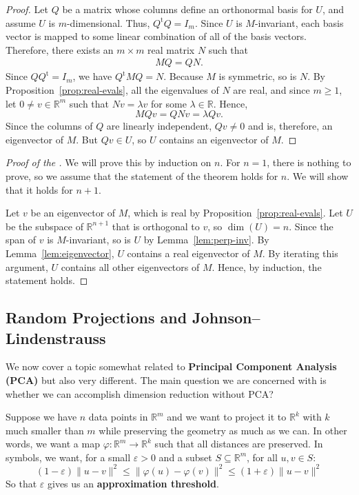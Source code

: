 \documentclass[a4paper, 12pt]{article}
\numberwithin{equation}{section}
\numberwithin{figure}{section}
\theoremstyle{definition}
\renewcommand{\leq}{\leqslant}
\renewcommand{\geq}{\geqslant}
\newcommand{\R}{\mathbb{R}}
\newcommand{\tr}{\mathrm{t}}
\begin{document}
\begin{proof}
	Let $Q$ be a matrix whose columns define an orthonormal basis for $U$, and
	assume $U$ is $m$-dimensional. Thus, $Q^{\tr}Q = I_m$. Since $U$ is
	$M$-invariant, each basis vector is mapped to some linear combination of all
	of the basis vectors. Therefore, there exists an $m\times m$ real matrix $N$
	such that 
	\begin{align*}
		MQ = QN. 
	\end{align*}
	Since $QQ^{\tr} = I_m$, we have $Q^{\tr}MQ = N$. Because $M$ is symmetric,
	so is $N$. By Proposition~\ref{prop:real-evals}, all the eigenvalues of $N$ are real,
	and since $m\geq 1$, let $0\neq v\in\R^m$ such that $Nv=\lambda v$ for some
	$\lambda\in \R$. Hence, 
	\[ 
		MQv = QNv = \lambda Qv.
	\] 
	Since the columns of $Q$ are linearly independent, $Qv\neq 0$ and is,
	therefore, an eigenvector of $M$. But $Qv\in U$, so $U$ contains an
	eigenvector of $M$.
\end{proof}

\begin{proof}[Proof of the ]
	We will prove this by induction on $n$. For $n=1$, there is nothing to
	prove, so we assume that the statement of the theorem holds for $n$. We will
	show that it holds for $n+1$.

	Let $v$ be an eigenvector of $M$, which is real by Proposition~\ref{prop:real-evals}.
	Let $U$ be the subspace of $\R^{n+1}$ that is orthogonal to $v$, so $\dim(U)
	= n$. Since the span of $v$ is $M$-invariant, so is $U$ by
	Lemma~\ref{lem:perp-inv}. By Lemma~\ref{lem:eigenvector}, $U$ contains a real
	eigenvector of $M$. By iterating this argument, $U$ contains all other
	eigenvectors of $M$. Hence, by induction, the statement holds. 
\end{proof}

\subsection{Random Projections and Johnson--Lindenstrauss}

We now cover a topic somewhat related to \textbf{Principal Component Analysis
(PCA)} but also very different. The main question we are concerned with is
whether we can accomplish dimension reduction without PCA?

Suppose we have $n$ data points in $\R^m$ and we want to project it to $\R^k$
with $k$ much smaller than $m$ while preserving the geometry as much as we can.
In other words, we want a map $\varphi: \R^m \to \R^k$ such that all distances are
preserved. In symbols, we want, for a small $\varepsilon > 0$ and a subset $S
\subseteq \R^m$, for all $u, v \in S$:
\begin{equation}\label{eqn:thres}
	(1 - \varepsilon) \lVert u - v \rVert^2 \leq \lVert \varphi(u) - \varphi(v)
	\rVert^2 \leq (1 + \varepsilon) \lVert u - v \rVert^2
\end{equation}
So that $\varepsilon$ gives us an \textbf{approximation threshold}.
\end{document}
